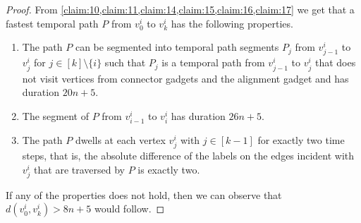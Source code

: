 \documentclass[a4paper,UKenglish,cleveref, autoref, thm-restate]{lipics-v2021}
\begin{document}
\begin{proof}
From \cref{claim:10,claim:11,claim:14,claim:15,claim:16,claim:17} we get that a fastest temporal path $P$ from $v^i_0$ to $v^i_k$ has the following properties.
\begin{enumerate}
    \item The path $P$ can be segmented into temporal path segments $P_j$ from $v^i_{j-1}$ to $v^i_j$ for $j\in[k]\setminus\{i\}$ such that $P_j$ is a temporal path from $v^i_{j-1}$ to $v^i_j$ that does not visit vertices from connector gadgets and the alignment gadget and has duration $20n+5$.
    \item The segment of $P$ from $v^i_{i-1}$ to $v^i_i$ has duration $26n+5$.
    \item The path $P$ dwells at each vertex $v^i_j$ with $j\in[k-1]$ for exactly two time steps, that is, the absolute difference of the labels on the edges incident with $v^i_j$ that are traversed by $P$ is exactly two.
\end{enumerate}
If any of the properties does not hold, then we can observe that $d(v^i_0,v^i_k)>8n+5$ would follow.


\end{proof}
\end{document}
